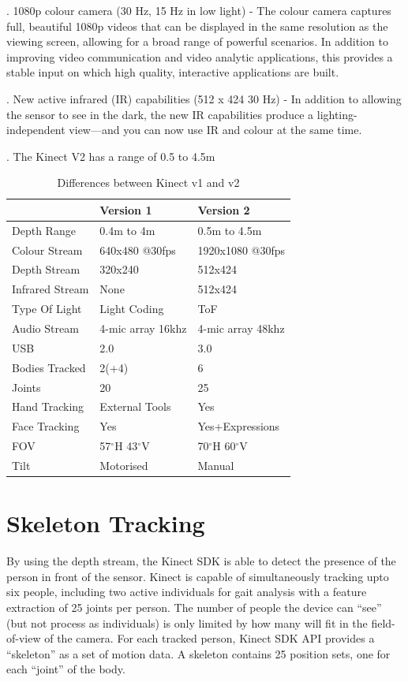 . 1080p colour camera (30 Hz, 15 Hz in low light) - The colour camera captures full, beautiful 1080p videos that can be displayed in the same resolution as the viewing screen, allowing for a broad range of powerful scenarios. In addition to improving video communication and video analytic applications, this provides a stable input on which high quality, interactive applications are built.

. New active infrared (IR) capabilities (512 x 424 30 Hz) - In addition to allowing the sensor to see in the dark, the new IR capabilities produce a lighting-independent view—and you can now use IR and colour at the same time.

. The Kinect V2 has a range of 0.5 to 4.5m
\newpage
\def\arraystretch{1.7}
\begin{table} [t]

\begin{tabular}{ |p{5cm}||p{5cm}|p{5cm}| }
 \hline
 \cellcolor{pink} & \cellcolor{pink} Version 1  &  \cellcolor{pink} Version 2 \\
 \hline
Depth Range  & 0.4m to 4m  & 0.5m to 4.5m  \\
Colour Stream & 640x480 @30fps & 1920x1080 @30fps \\
Depth Stream  & 320x240  & 512x424  \\
Infrared Stream & None & 512x424  \\
Type Of Light  & Light Coding  & ToF  \\
Audio Stream & 4-mic array 16khz & 4-mic array 48khz \\
USB  & 2.0  & 3.0  \\
Bodies Tracked  & 2(+4) & 6  \\
Joints & 20 & 25 \\
Hand Tracking & External Tools  & Yes  \\
Face Tracking  & Yes  & Yes+Expressions  \\
FOV & 57$^{\circ}$H 43$^{\circ}$V & 70$^{\circ}$H 60$^{\circ}$V \\
Tilt  & Motorised  & Manual  \\
\hline
\end{tabular}
\caption{Differences between Kinect v1 and v2}
\end{table}

\clearpage


\section{Skeleton Tracking} \label{Skeleton Tracking} 
\noindent By using the depth stream, the Kinect SDK is able to detect the presence of the person in front of the sensor. Kinect is capable of simultaneously tracking upto six people, including two active individuals for gait analysis with a feature extraction of 25 joints per person. The number of people the device can “see” (but not process as individuals) is only limited by how many will fit in the field-of-view of the camera. For each tracked person, Kinect SDK API provides a “skeleton” as a set of motion data. A skeleton contains 25 position sets, one for each “joint” of the body.

